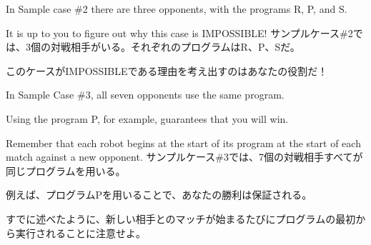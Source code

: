 \documentclass[uplatex,dvipdfmx]{jsarticle} \usepackage{amsmath,amssymb,bm}
\begin{document}
\vspace{\baselineskip}
\begin{paracol}{2}
In Sample case \#2 there are three opponents, with the programs R, P, and S.

It is up to you to figure out why this case is IMPOSSIBLE!
\switchcolumn
サンプルケース\#2では、3個の対戦相手がいる。それぞれのプログラムはR、P、Sだ。

このケースがIMPOSSIBLEである理由を考え出すのはあなたの役割だ！
\end{paracol}
\vspace{\baselineskip}
\begin{paracol}{2}
In Sample Case \#3, all seven opponents use the same program.

Using the program P, for example, guarantees that you will win.

Remember that each robot begins at the start of its program at the start of each match against a new opponent.
\switchcolumn
サンプルケース\#3では、7個の対戦相手すべてが同じプログラムを用いる。

例えば、プログラムPを用いることで、あなたの勝利は保証される。

すでに述べたように、新しい相手とのマッチが始まるたびにプログラムの最初から実行されることに注意せよ。
\end{paracol}
\end{document}
